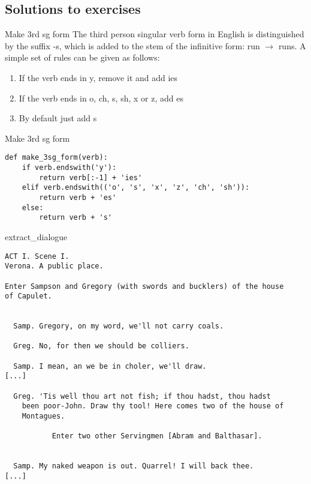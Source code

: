 \documentclass[aspectratio=169,usenames,dvipsnames]{beamer}
\begin{document}

\subsection{Solutions to exercises}
\begin{frame}{Make 3rd sg form}
The third person singular verb form in English is distinguished by the suffix
-s, which is added to the stem of the infinitive form: run $\rightarrow$ runs.
A simple set of rules can be given as follows:
\begin{enumerate}
    \item If the verb ends in y, remove it and add ies
    \item If the verb ends in o, ch, s, sh, x or z, add es
    \item By default just add s
\end{enumerate}
\end{frame}

\begin{frame}[fragile]{Make 3rd sg form}
\begin{lstlisting}
def make_3sg_form(verb):
    if verb.endswith('y'):
        return verb[:-1] + 'ies'
    elif verb.endswith(('o', 's', 'x', 'z', 'ch', 'sh')):
        return verb + 'es'
    else:
        return verb + 's'
\end{lstlisting}
\end{frame}


\begin{frame}[fragile]{extract\_dialogue}
\scriptsize
\begin{verbatim}
ACT I. Scene I.
Verona. A public place.

Enter Sampson and Gregory (with swords and bucklers) of the house
of Capulet.


  Samp. Gregory, on my word, we'll not carry coals.

  Greg. No, for then we should be colliers.

  Samp. I mean, an we be in choler, we'll draw.
[...]

  Greg. 'Tis well thou art not fish; if thou hadst, thou hadst
    been poor-John. Draw thy tool! Here comes two of the house of
    Montagues.

           Enter two other Servingmen [Abram and Balthasar].


  Samp. My naked weapon is out. Quarrel! I will back thee.
[...]
\end{verbatim}
\end{frame}
\end{document}
